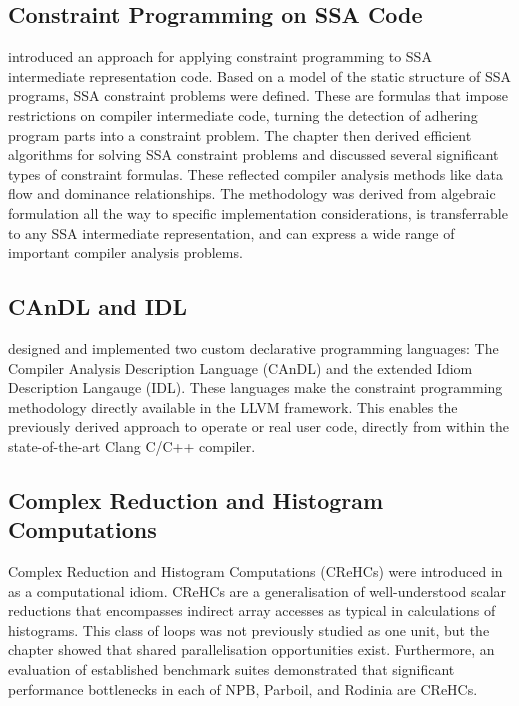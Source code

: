 \subsection{Constraint Programming on SSA Code}

     introduced an approach for applying constraint
    programming to SSA intermediate representation code.
    Based on a model of the static structure of SSA programs, SSA constraint
    problems were defined.
    These are formulas that impose restrictions on compiler intermediate code,
    turning the detection of adhering program parts into a constraint problem.
    The chapter then derived efficient algorithms for solving SSA constraint
    problems and discussed several significant types of constraint formulas.
    These reflected compiler analysis methods like data flow and dominance
    relationships.
    The methodology was derived from algebraic formulation all the way to
    specific implementation considerations, is transferrable to any SSA
    intermediate representation, and can express a wide range of important
    compiler analysis problems.

\subsection{CAnDL and IDL}

     designed and implemented two
    custom declarative programming languages: The Compiler Analysis
    Description Language (CAnDL) and the extended Idiom Description Langauge
    (IDL).
    These languages make the constraint programming methodology directly
    available in the LLVM framework.
    This enables the previously derived approach to operate or real user code,
    directly from within the state-of-the-art Clang C/C++ compiler.

\subsection{Complex Reduction and Histogram Computations}

    Complex Reduction and Histogram Computations (CReHCs) were introduced in
     as a computational idiom.
    CReHCs are a generalisation of well-understood scalar reductions that
    encompasses indirect array accesses as typical in calculations of
    histograms.
    This class of loops was not previously studied as one unit, but the
    chapter showed that shared parallelisation opportunities exist.
    Furthermore, an evaluation of established benchmark suites demonstrated
    that significant performance bottlenecks in each of NPB, Parboil, and
    Rodinia are CReHCs.

